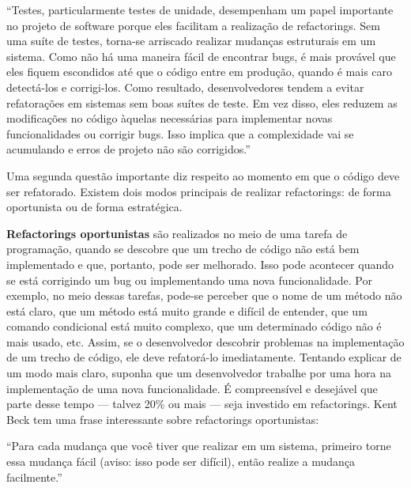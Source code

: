\documentclass[
  11pt,
  twoside]{book}
\renewenvironment{quote}{\centering \vspace{1.5ex} \begin{tcolorbox}[colback=backcolor, width=4.9in]}{\end{tcolorbox}}
\begin{document}

\begin{quote}
``Testes, particularmente testes de unidade, desempenham um papel
importante no projeto de software porque eles facilitam a realização de
refactorings. Sem uma suíte de testes, torna-se arriscado realizar
mudanças estruturais em um sistema. Como não há uma maneira fácil de
encontrar bugs, é mais provável que eles fiquem escondidos até que o
código entre em produção, quando é mais caro detectá-los e corrigi-los.
Como resultado, desenvolvedores tendem a evitar refatorações em sistemas
sem boas suítes de teste. Em vez disso, eles reduzem as modificações no
código àquelas necessárias para implementar novas funcionalidades ou
corrigir bugs. Isso implica que a complexidade vai se acumulando e erros
de projeto não são corrigidos.''
\end{quote}

Uma segunda questão importante diz respeito ao momento em que o código
deve ser refatorado. Existem dois modos principais de realizar
refactorings: de forma oportunista ou de forma estratégica.

 \textbf{Refactorings oportunistas} são
realizados no meio de uma tarefa de programação, quando se descobre que
um trecho de código não está bem implementado e que, portanto, pode ser
melhorado. Isso pode acontecer quando se está corrigindo um bug ou
implementando uma nova funcionalidade. Por exemplo, no meio dessas
tarefas, pode-se perceber que o nome de um método não está claro, que um
método está muito grande e difícil de entender, que um comando
condicional está muito complexo, que um determinado código não é mais
usado, etc. Assim, se o desenvolvedor descobrir problemas na
implementação de um trecho de código, ele deve refatorá-lo
imediatamente. Tentando explicar de um modo mais claro, suponha que um
desenvolvedor trabalhe por uma hora na implementação de uma nova
funcionalidade. É compreensível e desejável que parte desse tempo ---
talvez 20\% ou mais --- seja investido em refactorings. Kent Beck tem
uma frase interessante sobre refactorings oportunistas:


\begin{quote}
``Para cada mudança que você tiver que realizar em um sistema, primeiro
torne essa mudança fácil (aviso: isso pode ser difícil), então realize a
mudança facilmente.''
\end{quote}
\end{document}
